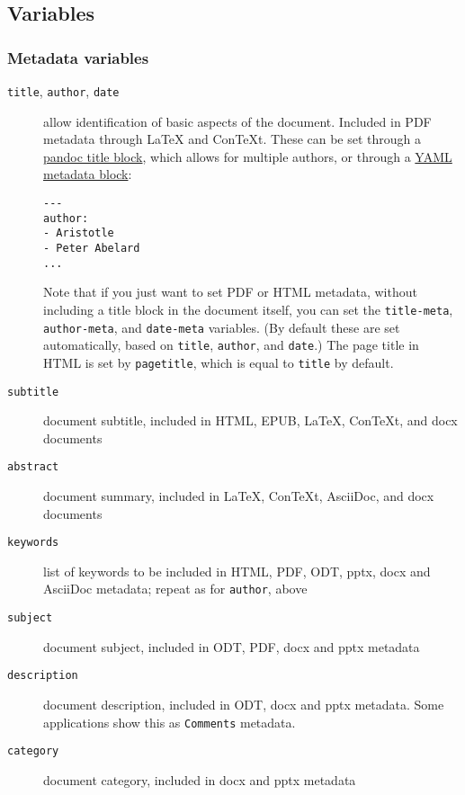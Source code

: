 \documentclass[]{article}
\begin{document}
\hypertarget{variables}{%
\subsection{Variables}\label{variables}}

\hypertarget{metadata-variables}{%
\subsubsection{Metadata variables}\label{metadata-variables}}

\begin{description}
\item[\texttt{title}, \texttt{author}, \texttt{date}]
allow identification of basic aspects of the document. Included in PDF
metadata through LaTeX and ConTeXt. These can be set through a
\protect\hyperlink{extension-pandoc_title_block}{pandoc title block},
which allows for multiple authors, or through a
\protect\hyperlink{extension-yaml_metadata_block}{YAML metadata block}:

\begin{verbatim}
---
author:
- Aristotle
- Peter Abelard
...
\end{verbatim}

Note that if you just want to set PDF or HTML metadata, without
including a title block in the document itself, you can set the
\texttt{title-meta}, \texttt{author-meta}, and \texttt{date-meta}
variables. (By default these are set automatically, based on
\texttt{title}, \texttt{author}, and \texttt{date}.) The page title in
HTML is set by \texttt{pagetitle}, which is equal to \texttt{title} by
default.
\item[\texttt{subtitle}]
document subtitle, included in HTML, EPUB, LaTeX, ConTeXt, and docx
documents
\item[\texttt{abstract}]
document summary, included in LaTeX, ConTeXt, AsciiDoc, and docx
documents
\item[\texttt{keywords}]
list of keywords to be included in HTML, PDF, ODT, pptx, docx and
AsciiDoc metadata; repeat as for \texttt{author}, above
\item[\texttt{subject}]
document subject, included in ODT, PDF, docx and pptx metadata
\item[\texttt{description}]
document description, included in ODT, docx and pptx metadata. Some
applications show this as \texttt{Comments} metadata.
\item[\texttt{category}]
document category, included in docx and pptx metadata
\end{description}
\end{document}
